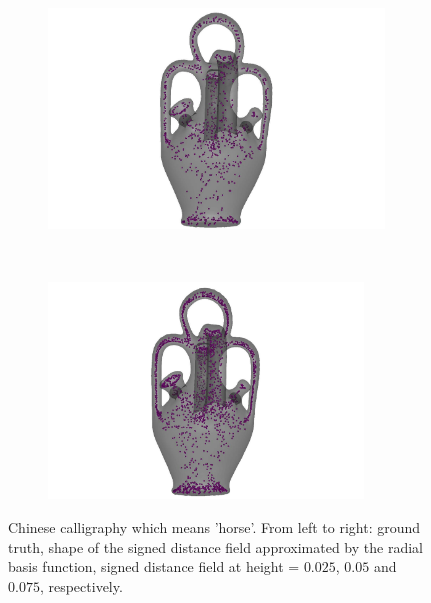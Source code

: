 \documentclass[review]{acmsiggraph}
\begin{document}
\begin{figure}
\begin{subfigure}[b]{0.24\linewidth}
        \end{subfigure}
~
		\begin{subfigure}[b]{0.24\linewidth}
                \centering
                \includegraphics[width=0.98\textwidth]{images/vase/3.pdf}
        \end{subfigure}
~
		\begin{subfigure}[b]{0.24\linewidth}
                \centering
                \includegraphics[width=0.92\textwidth]{images/vase/4.pdf}
        \end{subfigure}
        \caption{Chinese calligraphy which means 'horse'. From left to right: ground truth, shape of the signed distance field approximated by the radial basis function, signed distance field at height = $0.025$, $0.05$ and $0.075$, respectively. }
				\label{fig:horse}
\end{figure}
\end{document}
